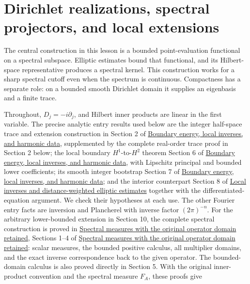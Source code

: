 \documentclass[
  11pt,
]{article}
\author{}
\date{}
\makeatletter
\let\ReaderOriginalAnchorStart\hyper@anchorstart
\let\ReaderOriginalAnchorEnd\hyper@anchorend
\let\ReaderPendingAliases\@empty
\def\ReaderArmAliases#1{\gdef\ReaderPendingAliases{#1}}
\def\hyper@anchorstart#1{\ReaderIfNativeAnchorTF{#1}{\ReaderPendingAliases\global\let\ReaderPendingAliases\@empty}{}\ReaderOriginalAnchorStart{#1}}
\makeatother
\begin{document}
\ReaderArmAliases{\ReaderOriginalAnchorStart{dirichlet-realizations-spectral-projectors-and-local-extensions}\ReaderOriginalAnchorEnd}
\section{Dirichlet realizations, spectral projectors, and local
extensions}\label{dirichlet-realizations-spectral-projectors-and-local-extensions}

The central construction in this lesson is a bounded point-evaluation
functional on a spectral subspace. Elliptic estimates bound that
functional, and its Hilbert-space representative produces a spectral
kernel. This construction works for a sharp spectral cutoff even when
the spectrum is continuous. Compactness has a separate role: on a
bounded smooth Dirichlet domain it supplies an eigenbasis and a finite
trace.

Throughout, \(D_j=-i\partial_j\), and Hilbert inner products are linear
in the first variable. The precise analytic entry results used below are
the integer half-space trace and extension construction in Section 2 of
\href{second-order-boundary.pdf}{Boundary energy, local inverses, and
harmonic data}, supplemented by the complete real-order trace proof in
Section 2 below; the local boundary \(H^1\)-to-\(H^2\) theorem Section 6
of \href{second-order-boundary.pdf}{Boundary energy, local inverses, and
harmonic data}, with Lipschitz principal and bounded lower coefficients;
its smooth integer bootstrap Section 7 of
\href{second-order-boundary.pdf}{Boundary energy, local inverses, and
harmonic data}; and the interior counterpart Section 8 of
\href{local-elliptic-coefficients.pdf}{Local inverses and
distance-weighted elliptic estimates} together with the
differentiated-equation argument. We check their hypotheses at each use.
The other Fourier entry facts are inversion and Plancherel with inverse
factor \((2\pi)^{-n}\). For the arbitrary lower-bounded extension in
Section 10, the complete spectral construction is proved in
\href{lower-bounded-spectral-calculus.pdf}{Spectral measures with the
original operator domain retained}, Sections 1--4 of
\href{lower-bounded-spectral-calculus.pdf}{Spectral measures with the
original operator domain retained}: scalar measures, the bounded
positive calculus, all multiplier domains, and the exact inverse
correspondence back to the given operator. The bounded-domain calculus
is also proved directly in Section 5. With the original inner-product
convention and the spectral measure \(F_A\), these proofs give
\end{document}
